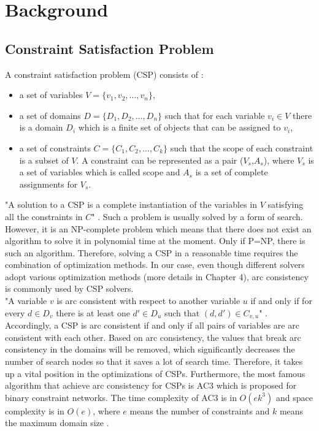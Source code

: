 \chapter{Background}
\label{cha:background}
\section{Constraint Satisfaction Problem}
A constraint satisfaction problem (CSP) consists of \cite{r18}:
\begin{itemize}
  \item a set of variables $V = \{{v_{1}, v_{2},..., v_{n}}\}$,
  \item a set of domains $D = \{D_{1}, D_{2},..., D_{n}\}$ such that for each
variable $v_{i} \in V$ there is a domain $D_{i}$ which is a finite set of objects that can be assigned to $v_{i}$,
  \item a set of constraints $C = \{C_{1}, C_{2},..., C_{k}\}$ such that the scope of each constraint is a subset of $V$. A constraint can be represented as a pair ($V_{s}$,$A_{s}$), where $V_{s}$ is a set of variables which is called scope and $A_{s}$ is a set of complete assignments for $V_{s}$.
\end{itemize}
"A solution to a CSP is a complete instantiation of the variables in $V$ satisfying all the constraints in $C$" \cite{r18}. Such a problem is usually solved by a form of search. However, it is an NP-complete problem which means that there does not exist an algorithm to solve it in polynomial time at the moment. Only if P=NP, there is such an algorithm. Therefore, solving a CSP in a reasonable time requires the combination of optimization methods. In our case, even though different solvers adopt various optimization methods (more details in Chapter 4), arc consistency is commonly used by CSP solvers.\\ 
"A variable $v$ is arc consistent with respect to another variable $u$ if and only if for every $d \in D_{v}$ there is at least one $d'\in D_{u}$ such that $(d,d')\in C_{v,u}$" \cite{r7}. Accordingly, a CSP is arc consistent if and only if all pairs of variables are arc consistent with each other. Based on arc consistency, the values that break arc consistency in the domains will be removed, which significantly decreases the number of search nodes so that it saves a lot of search time. Therefore, it takes up a vital position in the optimizations of CSPs. Furthermore, the most famous algorithm that achieve arc consistency for CSPs is AC3 which is proposed for binary constraint networks. The time complexity of AC3 is in $O(ek^{3})$ and space complexity is in $O(e)$, where $e$ means the number of constraints and $k$ means the maximum domain size \cite{r11}.
